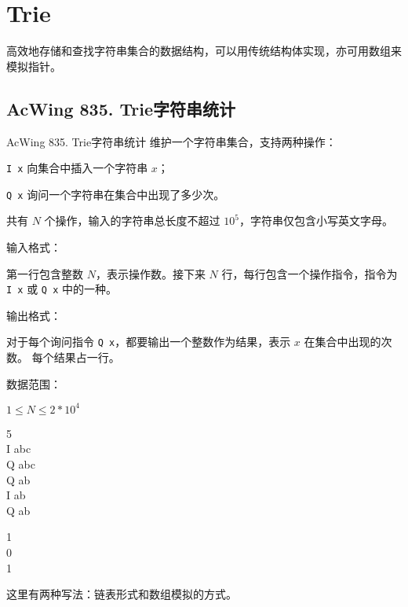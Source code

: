 \begin{mycpptwocol}[KMP]
    
\end{mycpptwocol}

\section{Trie}
高效地存储和查找字符串集合的数据结构，可以用传统结构体实现，亦可用数组来模拟指针。


\subsection{AcWing 835. Trie字符串统计}

\begin{titledbox}{AcWing 835. Trie字符串统计}
维护一个字符串集合，支持两种操作：

\lstinline{I x} 向集合中插入一个字符串 $x$；

\lstinline{Q x} 询问一个字符串在集合中出现了多少次。

共有 $N$ 个操作，输入的字符串总长度不超过 $10^5$，字符串仅包含小写英文字母。

输入格式：

第一行包含整数 $N$，表示操作数。接下来 $N$ 行，每行包含一个操作指令，指令为 \lstinline{I x} 或 \lstinline{Q x} 中的一种。

输出格式：

对于每个询问指令 \lstinline{Q x}，都要输出一个整数作为结果，表示 $x$ 在集合中出现的次数。
每个结果占一行。

数据范围：

$1 \le N \le 2*10^4$

\begin{inputblock}
    5 \\
    I abc \\
    Q abc \\
    Q ab \\
    I ab \\
    Q ab
\end{inputblock}
\begin{outputblock}
    1 \\
    0 \\
    1
\end{outputblock}
\end{titledbox}

这里有两种写法：链表形式和数组模拟的方式。

